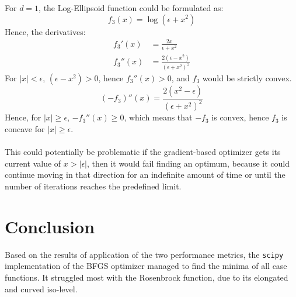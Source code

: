\documentclass[a4paper]{article}
\begin{document}
\subsubsection{}
For $d=1$, the Log-Ellipsoid function could be formulated as:
\[
  f_3(x) = \log(\epsilon + x^2) 
\]
Hence, the derivatives:
\begin{align*}
  f_3'(x) &= \frac{2x}{\epsilon + x^2} \\
  f_3''(x) &= \frac{2(\epsilon - x^2)}{(\epsilon + x^2)^2}
\end{align*}
For $|x| < \epsilon$, $(\epsilon - x^2) > 0$, hence $f_3''(x) > 0$, and $f_3$
would be strictly convex.
\[
(-f_3)''(x) = \frac{2(x^2 - \epsilon)}{(\epsilon + x^2)^2}
\]
Hence, for $|x| \geq \epsilon$, $-f_3''(x) \geq 0$, which means that $-f_3$ is
convex, hence $f_3$ is concave for $|x| \geq \epsilon$.\\\\
This could potentially be problematic if the gradient-based optimizer gets its current value of
$x>|\epsilon|$, then it would fail finding an optimum, because it could continue
moving in that direction for an indefinite amount of time or until the number of
iterations reaches the predefined limit. 

\section{Conclusion}
Based on the results of application of the two performance metrics, the
\texttt{scipy} implementation of the BFGS optimizer managed to find the minima
of all case functions. It struggled most with the Rosenbrock function, due to its
elongated and curved iso-level.
\end{document}
